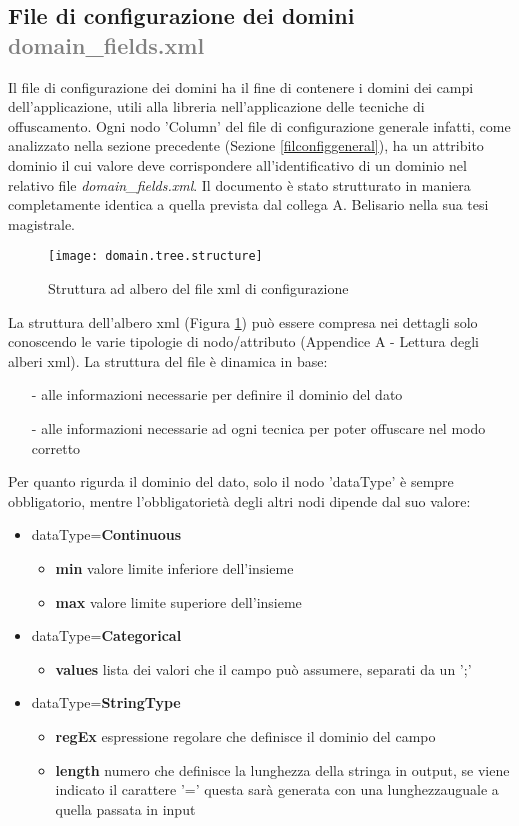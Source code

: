 \subsection*{File di configurazione dei domini \textcolor{gray}{domain\_fields.xml}}
Il file di configurazione dei domini ha il fine di contenere i domini dei campi dell'applicazione, utili alla libreria nell'applicazione delle tecniche di offuscamento. Ogni nodo 'Column' del file di configurazione generale infatti, come analizzato nella sezione precedente (Sezione \ref{filconfiggeneral}), ha un attribito dominio il cui valore deve corrispondere all'identificativo di un dominio nel relativo file \emph{domain\_fields.xml}. Il documento è stato strutturato in maniera completamente identica a quella prevista dal collega A. Belisario nella sua tesi magistrale. 
\begin{figure}[H]
	\texttt{[image: domain.tree.structure]}
	\centering
	\caption{Struttura ad albero del file xml di configurazione}%
    \label{fig:domainconfigstructure}
\end{figure}
\noindent La struttura dell'albero xml (Figura \ref{fig:domainconfigstructure}) può essere compresa nei dettagli solo conoscendo le varie tipologie di nodo/attributo (Appendice A - Lettura degli alberi xml). La struttura del file è dinamica in base:
\begin{itemize} [nosep]
\item [-]  alle informazioni necessarie per definire il dominio del dato
\item [-]  alle informazioni necessarie ad ogni tecnica per poter offuscare nel modo corretto
\end{itemize}
Per quanto rigurda il dominio del dato, solo il  nodo 'dataType' è  sempre obbligatorio, mentre l'obbligatorietà degli altri nodi dipende dal suo valore:
\begin{itemize}[nosep]
\item dataType=\textbf{Continuous}
\begin{itemize}[nosep]
\item\textbf{min}  valore limite inferiore dell’insieme
\item\textbf{max}  valore limite superiore dell’insieme
\end{itemize}
\item dataType=\textbf{Categorical}
\begin{itemize}[nosep]
\item\textbf{values}  lista dei valori che il campo può assumere, separati da un ';'
\end{itemize}
\item dataType=\textbf{StringType}
\begin{itemize}[nosep]
\item\textbf{regEx}  espressione regolare che definisce il dominio del campo
\item\textbf{length}  numero che definisce la lunghezza della stringa in output, se viene indicato il carattere ’=’ questa sarà generata con una lunghezzauguale a quella passata in input
\end{itemize}
\end{itemize}
